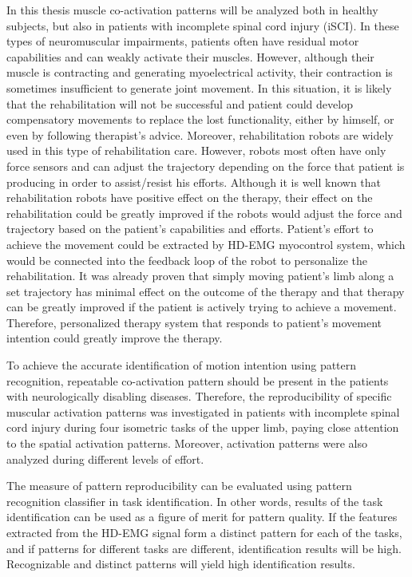 In this thesis muscle co-activation patterns will be analyzed both in healthy subjects, but also in patients with incomplete spinal cord injury (iSCI). In these types of neuromuscular impairments, patients often have residual motor capabilities and can weakly activate their muscles. However, although their muscle is contracting and generating myoelectrical activity, their contraction is sometimes insufficient to generate joint movement. In this situation, it is likely that the rehabilitation will not be successful and patient could develop compensatory movements to replace the lost functionality, either by himself, or even by following therapist's advice. Moreover, rehabilitation robots are widely used in this type of rehabilitation care. However, robots most often have only force sensors and can adjust the trajectory depending on the force that patient is producing in order to assist/resist his efforts. Although it is well known that rehabilitation robots have positive effect on the therapy, their effect on the rehabilitation could be greatly improved if the robots would adjust the force and trajectory based on the patient's capabilities and efforts. Patient's effort to achieve the movement could be extracted by HD-EMG myocontrol system, which would be connected into the feedback loop of the robot to personalize the rehabilitation. It was already proven that simply moving patient's limb along a set trajectory has minimal effect on the outcome of the therapy and that therapy can be greatly improved if the patient is actively trying to achieve a movement. Therefore, personalized therapy system that responds to patient's movement intention could greatly improve the therapy.

To achieve the accurate identification of motion intention using pattern recognition, repeatable co-activation pattern should be present in the patients with neurologically disabling diseases. Therefore, the reproducibility of specific muscular activation patterns was investigated in patients with incomplete spinal cord injury during four isometric tasks of the upper limb, paying close attention to the spatial activation patterns. Moreover, activation patterns were also analyzed during different levels of effort.

The measure of pattern reproducibility can be evaluated using pattern recognition classifier in task identification. In other words, results of the task identification can be used as a figure of merit for pattern quality. If the features extracted from the HD-EMG signal form a distinct pattern for each of the tasks, and if patterns for different tasks are different, identification results will be high. Recognizable and distinct patterns will yield high identification results.
   
